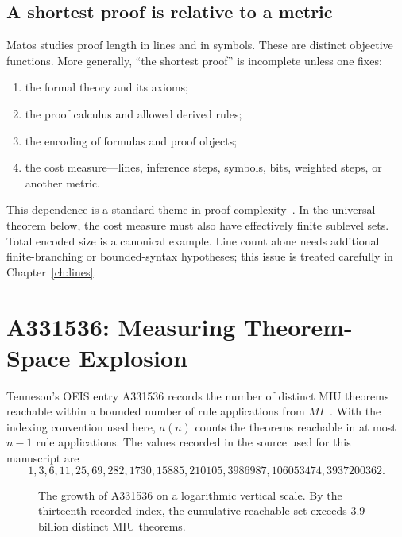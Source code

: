 \documentclass[11pt,oneside]{book}
\theoremstyle{definition}
\theoremstyle{remark}
\begin{document}
\section{A shortest proof is relative to a metric}
Matos studies proof length in lines and in symbols. These are distinct objective functions. More generally, ``the shortest proof'' is incomplete unless one fixes:
\begin{enumerate}[label=(\roman*)]
\item the formal theory and its axioms;
\item the proof calculus and allowed derived rules;
\item the encoding of formulas and proof objects;
\item the cost measure---lines, inference steps, symbols, bits, weighted steps, or another metric.
\end{enumerate}
This dependence is a standard theme in proof complexity~\cite{cookreckhow1979}. In the universal theorem below, the cost measure must also have effectively finite sublevel sets. Total encoded size is a canonical example. Line count alone needs additional finite-branching or bounded-syntax hypotheses; this issue is treated carefully in Chapter~\ref{ch:lines}.

\chapter{A331536: Measuring Theorem-Space Explosion}
Tenneson's OEIS entry A331536 records the number of distinct MIU theorems reachable within a bounded number of rule applications from $MI$~\cite{oeisA331536}. With the indexing convention used here, $a(n)$ counts the theorems reachable in at most $n-1$ rule applications. The values recorded in the source used for this manuscript are
\[
1,3,6,11,25,69,282,1730,15885,210105,3986987,106053474,3937200362.
\]

\begin{figure}[ht]
\centering
{}
\caption{The growth of A331536 on a logarithmic vertical scale. By the thirteenth recorded index, the cumulative reachable set exceeds $3.9$ billion distinct MIU theorems.}
\label{fig:a331536}
\end{figure}
\end{document}
